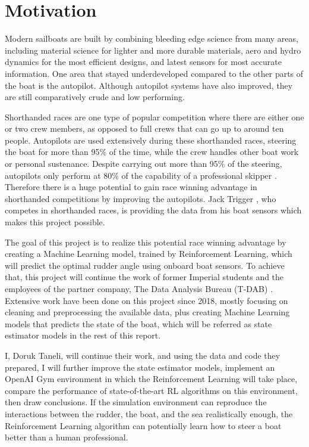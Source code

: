 \documentclass[12pt,twoside]{report}
\begin{document}
\section{Motivation}
Modern sailboats are built by combining bleeding edge science from many areas, including material science for lighter and more durable materials, aero and hydro dynamics for the most efficient designs, and latest sensors for most accurate information. One area that stayed underdeveloped compared to the other parts of the boat is the autopilot. Although autopilot systems have also improved, they are still comparatively crude and low performing.

Shorthanded races are one type of popular competition where there are either one or two crew members, as opposed to full crews that can go up to around ten people. Autopilots are used extensively during these shorthanded races, steering the boat for more than 95\% of the time, while the crew handles other boat work or personal sustenance. Despite carrying out more than 95\% of the steering, autopilots only perform at 80\% of the capability of a professional skipper \cite{trigger-racing}. Therefore there is a huge potential to gain race winning advantage in shorthanded competitions by improving the autopilots. Jack Trigger \cite{trigger-racing}, who competes in shorthanded races, is providing the data from his boat sensors which makes this project possible. 

The goal of this project is to realize this potential race winning advantage by creating a Machine Learning model, trained by Reinforcement Learning, which will predict the optimal rudder angle using onboard boat sensors. To achieve that, this project will continue the work of former Imperial students and the employees of the partner company, The Data Analysis Bureau (T-DAB) \cite{t-dab}. Extensive work have been done on this project since 2018, mostly focusing on cleaning and preprocessing the available data, plus creating Machine Learning models that predicts the state of the boat, which will be referred as state estimator models in the rest of this report.

I, Doruk Taneli, will continue their work, and using the data and code they prepared, I will further improve the state estimator models, implement an OpenAI Gym environment in which the Reinforcement Learning will take place, compare the performance of state-of-the-art RL algorithms on this environment, then draw conclusions. If the simulation environment can reproduce the interactions between the rudder, the boat, and the sea realistically enough, the Reinforcement Learning algorithm can potentially learn how to steer a boat better than a human professional.
\end{document}
